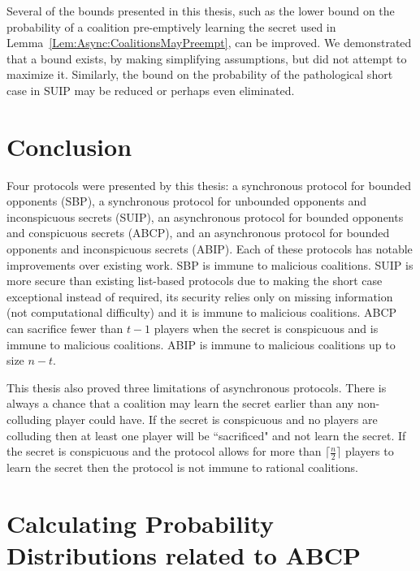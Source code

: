 \documentclass{dalcsthesis}
\begin{document}
Several of the bounds presented in this thesis, such as the lower bound on the probability of a coalition pre-emptively learning the secret used in Lemma~\ref{Lem:Async:CoalitionsMayPreempt}, can be improved. We demonstrated that a bound exists, by making simplifying assumptions, but did not attempt to maximize it. Similarly, the bound on the probability of the pathological short case in SUIP may be reduced or perhaps even eliminated. 



\chapter{Conclusion}
\label{chapter:Conclusion}

Four protocols were presented by this thesis: a synchronous protocol for bounded opponents (SBP), a synchronous protocol for unbounded opponents and inconspicuous secrets (SUIP), an asynchronous protocol for bounded opponents and conspicuous secrets (ABCP), and an asynchronous protocol for bounded opponents and inconspicuous secrets (ABIP). Each of these protocols has notable improvements over existing work. SBP is immune to malicious coalitions. SUIP is more secure than existing list-based protocols due to making the short case exceptional instead of required, its security relies only on missing information (not computational difficulty) and it is immune to malicious coalitions. ABCP can sacrifice fewer than $t-1$ players when the secret is conspicuous and is immune to malicious coalitions. ABIP is immune to malicious coalitions up to size $n-t$.

This thesis also proved three limitations of asynchronous protocols. There is always a chance that a coalition may learn the secret earlier than any non-colluding player could have. If the secret is conspicuous and no players are colluding then at least one player will be ``sacrificed" and not learn the secret. If the secret is conspicuous and the protocol allows for more than $\lceil \frac{n}{2} \rceil$ players to learn the secret then the protocol is not immune to rational coalitions.









\appendix
\chapter{Calculating Probability Distributions related to ABCP }
\label{Appendix:ABCP:Probabilities}
\end{document}

